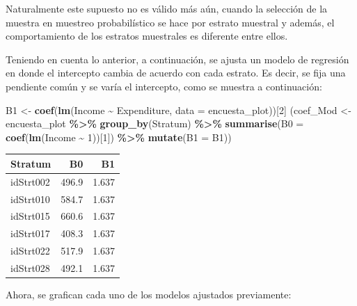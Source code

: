 \documentclass[
  12pt,
]{book}
\newenvironment{Shaded}{\begin{snugshade}}{\end{snugshade}}
\newcommand{\AttributeTok}[1]{\textcolor[rgb]{0.13,0.29,0.53}{#1}}
\newcommand{\DecValTok}[1]{\textcolor[rgb]{0.00,0.00,0.81}{#1}}
\newcommand{\FunctionTok}[1]{\textcolor[rgb]{0.13,0.29,0.53}{\textbf{#1}}}
\newcommand{\NormalTok}[1]{#1}
\newcommand{\OtherTok}[1]{\textcolor[rgb]{0.56,0.35,0.01}{#1}}
\newcommand{\SpecialCharTok}[1]{\textcolor[rgb]{0.81,0.36,0.00}{\textbf{#1}}}
\begin{document}
Naturalmente este supuesto no es válido más aún, cuando la selección de la muestra en muestreo probabilístico se hace por estrato muestral y además, el comportamiento de los estratos muestrales es diferente entre ellos.

Teniendo en cuenta lo anterior, a continuación, se ajusta un modelo de regresión en donde el intercepto cambia de acuerdo con cada estrato. Es decir, se fija una pendiente común y se varía el intercepto, como se muestra a continuación:

\begin{Shaded}
\begin{Highlighting}[]
\NormalTok{B1 }\OtherTok{\textless{}{-}} \FunctionTok{coef}\NormalTok{(}\FunctionTok{lm}\NormalTok{(Income }\SpecialCharTok{\textasciitilde{}}\NormalTok{ Expenditure, }\AttributeTok{data =}\NormalTok{ encuesta\_plot))[}\DecValTok{2}\NormalTok{]}
\NormalTok{(coef\_Mod }\OtherTok{\textless{}{-}}\NormalTok{ encuesta\_plot }\SpecialCharTok{\%\textgreater{}\%} \FunctionTok{group\_by}\NormalTok{(Stratum) }\SpecialCharTok{\%\textgreater{}\%} 
  \FunctionTok{summarise}\NormalTok{(}\AttributeTok{B0 =} \FunctionTok{coef}\NormalTok{(}\FunctionTok{lm}\NormalTok{(Income }\SpecialCharTok{\textasciitilde{}} \DecValTok{1}\NormalTok{))[}\DecValTok{1}\NormalTok{]) }\SpecialCharTok{\%\textgreater{}\%} 
  \FunctionTok{mutate}\NormalTok{(}\AttributeTok{B1 =}\NormalTok{ B1))}
\end{Highlighting}
\end{Shaded}

\begin{tabular}{l|r|r}
\hline
Stratum & B0 & B1\\
\hline
idStrt002 & 496.9 & 1.637\\
\hline
idStrt010 & 584.7 & 1.637\\
\hline
idStrt015 & 660.6 & 1.637\\
\hline
idStrt017 & 408.3 & 1.637\\
\hline
idStrt022 & 517.9 & 1.637\\
\hline
idStrt028 & 492.1 & 1.637\\
\hline
\end{tabular}

Ahora, se grafican cada uno de los modelos ajustados previamente:
\end{document}
